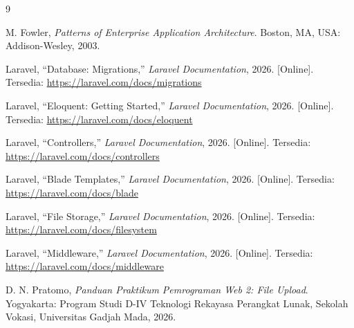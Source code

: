 \documentclass[12pt,a4paper]{article}
\begin{document}
\begin{thebibliography}{9}
\setlength{\itemsep}{2pt}

M. Fowler, \textit{Patterns of Enterprise Application Architecture}. Boston, MA, USA: Addison-Wesley, 2003.

Laravel, ``Database: Migrations,'' \textit{Laravel Documentation}, 2026. [Online]. Tersedia: \url{https://laravel.com/docs/migrations}

Laravel, ``Eloquent: Getting Started,'' \textit{Laravel Documentation}, 2026. [Online]. Tersedia: \url{https://laravel.com/docs/eloquent}

Laravel, ``Controllers,'' \textit{Laravel Documentation}, 2026. [Online]. Tersedia: \url{https://laravel.com/docs/controllers}

Laravel, ``Blade Templates,'' \textit{Laravel Documentation}, 2026. [Online]. Tersedia: \url{https://laravel.com/docs/blade}

Laravel, ``File Storage,'' \textit{Laravel Documentation}, 2026. [Online]. Tersedia: \url{https://laravel.com/docs/filesystem}

Laravel, ``Middleware,'' \textit{Laravel Documentation}, 2026. [Online]. Tersedia: \url{https://laravel.com/docs/middleware}

D. N. Pratomo, \textit{Panduan Praktikum Pemrograman Web 2: File Upload}. Yogyakarta: Program Studi D-IV Teknologi Rekayasa Perangkat Lunak, Sekolah Vokasi, Universitas Gadjah Mada, 2026.

\end{thebibliography}
\end{document}
